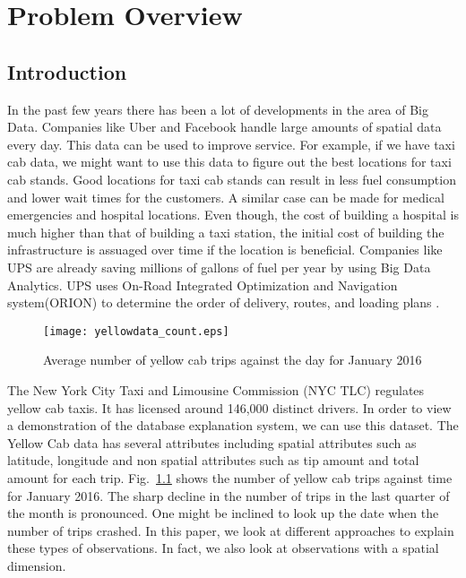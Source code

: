 \chapter{Problem Overview}


\label{sec:Intro}
\section{Introduction}

In the past few years there has been a lot of developments in the area of Big Data. Companies like Uber and Facebook handle large amounts of spatial data every day. This data can be used to improve service. For example, if we have taxi cab data, we might want to use this data to figure out the best locations for taxi cab stands. Good locations for taxi cab stands can result in less fuel consumption and lower wait times for the customers. A similar case can be made for medical emergencies and hospital locations. Even though, the cost of building a hospital is much higher than that of building a taxi station, the initial cost of building the infrastructure is assuaged over time if the location is beneficial. Companies like UPS are already saving millions of gallons of fuel per year by using Big Data Analytics. UPS uses On-Road Integrated Optimization and Navigation system(ORION) to determine the order of delivery, routes, and loading plans \citep{upsarticle}.

\begin{figure}[ht]
\texttt{[image: yellowdata\_count.eps]}
\caption{Average number of yellow cab trips against the day for January 2016}
\label{fig:yellowstats}
\end{figure}

The New York City Taxi and Limousine Commission (NYC TLC) regulates yellow cab taxis\citep{taxi2016tlc}. It has licensed around 146,000 distinct drivers. In order to view a demonstration of the database explanation system, we can use this dataset. The Yellow Cab data has several attributes including spatial attributes such as latitude, longitude and non spatial attributes such as tip amount and total amount for each trip. Fig.~\ref{fig:yellowstats} shows the number of yellow cab trips against time for January 2016. The sharp decline in the number of trips in the last quarter of the month is pronounced. One might be inclined to look up the date when the number of trips crashed. In this paper, we look at different approaches to explain these types of observations. In fact, we also look at observations with a spatial dimension.

